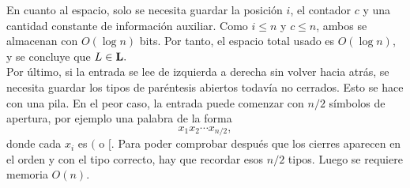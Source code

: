 \begin{ejercicio}
    En cuanto al espacio, solo se necesita guardar la posición $i$, el contador $c$ y una cantidad constante de información auxiliar. Como $i\leq n$ y $c\leq n$, ambos se almacenan con $O(\log n)$ bits. Por tanto, el espacio total usado es $O(\log n)$, y se concluye que
    $L\in \textbf{L}.$ \\

    Por último, si la entrada se lee de izquierda a derecha sin volver hacia atrás, se necesita guardar los tipos de paréntesis abiertos todavía no cerrados. Esto se hace con una pila. En el peor caso, la entrada puede comenzar con $n/2$ símbolos de apertura, por ejemplo una palabra de la forma
    $$
    x_1x_2\cdots x_{n/2},
    $$
    donde cada $x_i$ es $($ o $[$. 
    Para poder comprobar después que los cierres aparecen en el orden y con el tipo correcto, hay que recordar esos $n/2$ tipos. 
    Luego se requiere memoria $O(n)$.
\end{ejercicio}


